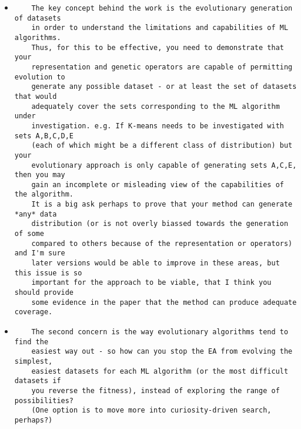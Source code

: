\documentclass[11pt]{article}
\begin{document}
\begin{itemize}

\item
\begin{verbatim}
    The key concept behind the work is the evolutionary generation of datasets
    in order to understand the limitations and capabilities of ML algorithms.
    Thus, for this to be effective, you need to demonstrate that your
    representation and genetic operators are capable of permitting evolution to
    generate any possible dataset - or at least the set of datasets that would
    adequately cover the sets corresponding to the ML algorithm under
    investigation. e.g. If K-means needs to be investigated with sets A,B,C,D,E
    (each of which might be a different class of distribution) but your
    evolutionary approach is only capable of generating sets A,C,E, then you may
    gain an incomplete or misleading view of the capabilities of the algorithm.
    It is a big ask perhaps to prove that your method can generate *any* data
    distribution (or is not overly biassed towards the generation of some
    compared to others because of the representation or operators) and I'm sure
    later versions would be able to improve in these areas, but this issue is so
    important for the approach to be viable, that I think you should provide
    some evidence in the paper that the method can produce adequate coverage.
\end{verbatim}



\item
\begin{verbatim}
    The second concern is the way evolutionary algorithms tend to find the
    easiest way out - so how can you stop the EA from evolving the simplest,
    easiest datasets for each ML algorithm (or the most difficult datasets if
    you reverse the fitness), instead of exploring the range of possibilities?
    (One option is to move more into curiosity-driven search, perhaps?)
\end{verbatim}



\end{itemize}
\end{document}
